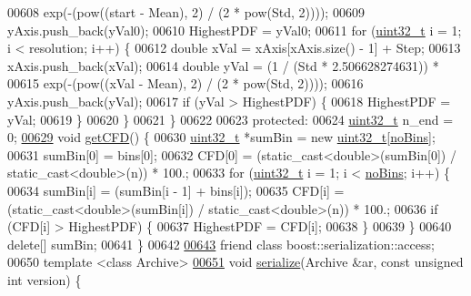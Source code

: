 \begin{DoxyCode}
00608                    exp(-(pow((start - Mean), 2) / (2 * pow(Std, 2))));
00609     yAxis.push\_back(yVal0);
00610     HighestPDF = yVal0;
00611     \textcolor{keywordflow}{for} (\hyperlink{_soil_math_types_8h_a435d1572bf3f880d55459d9805097f62}{uint32\_t} i = 1; i < resolution; i++) \{
00612       \textcolor{keywordtype}{double} xVal = xAxis[xAxis.size() - 1] + Step;
00613       xAxis.push\_back(xVal);
00614       \textcolor{keywordtype}{double} yVal = (1 / (Std * 2.506628274631)) *
00615                     exp(-(pow((xVal - Mean), 2) / (2 * pow(Std, 2))));
00616       yAxis.push\_back(yVal);
00617       \textcolor{keywordflow}{if} (yVal > HighestPDF) \{
00618         HighestPDF = yVal;
00619       \}
00620     \}
00621   \}
00622 
00623 \textcolor{keyword}{protected}:
00624   \hyperlink{_soil_math_types_8h_a435d1572bf3f880d55459d9805097f62}{uint32\_t} n\_end = 0; 
\hypertarget{_stats_8h_source_l00629}{}\hyperlink{class_soil_math_1_1_stats_a5508190fbea17bfec505ff8c47b1a45e}{00629}   \textcolor{keywordtype}{void} \hyperlink{class_soil_math_1_1_stats_a5508190fbea17bfec505ff8c47b1a45e}{getCFD}() \{
00630     \hyperlink{_soil_math_types_8h_a435d1572bf3f880d55459d9805097f62}{uint32\_t} *sumBin = \textcolor{keyword}{new} \hyperlink{_soil_math_types_8h_a435d1572bf3f880d55459d9805097f62}{uint32\_t}[\hyperlink{class_soil_math_1_1_stats_a4202c9085eacaff2e04eda84fc90e92b}{noBins}];
00631     sumBin[0] = bins[0];
00632     CFD[0] = (\textcolor{keyword}{static\_cast<}\textcolor{keywordtype}{double}\textcolor{keyword}{>}(sumBin[0]) / static\_cast<double>(n)) * 100.;
00633     \textcolor{keywordflow}{for} (\hyperlink{_soil_math_types_8h_a435d1572bf3f880d55459d9805097f62}{uint32\_t} i = 1; i < \hyperlink{class_soil_math_1_1_stats_a4202c9085eacaff2e04eda84fc90e92b}{noBins}; i++) \{
00634       sumBin[i] = (sumBin[i - 1] + bins[i]);
00635       CFD[i] = (\textcolor{keyword}{static\_cast<}\textcolor{keywordtype}{double}\textcolor{keyword}{>}(sumBin[i]) / static\_cast<double>(n)) * 100.;
00636       \textcolor{keywordflow}{if} (CFD[i] > HighestPDF) \{
00637         HighestPDF = CFD[i];
00638       \}
00639     \}
00640     \textcolor{keyword}{delete}[] sumBin;
00641   \}
00642 
\hypertarget{_stats_8h_source_l00643}{}\hyperlink{class_soil_math_1_1_stats_ac98d07dd8f7b70e16ccb9a01abf56b9c}{00643}   \textcolor{keyword}{friend} \textcolor{keyword}{class }boost::serialization::access; 
00650   \textcolor{keyword}{template} <\textcolor{keyword}{class} Archive>
\hypertarget{_stats_8h_source_l00651}{}\hyperlink{class_soil_math_1_1_stats_a708500880cf0fccd205fb59787f8899f}{00651}   \textcolor{keywordtype}{void} \hyperlink{class_soil_math_1_1_stats_a708500880cf0fccd205fb59787f8899f}{serialize}(Archive &ar, \textcolor{keyword}{const} \textcolor{keywordtype}{unsigned} \textcolor{keywordtype}{int} version) \{

\end{DoxyCode}
